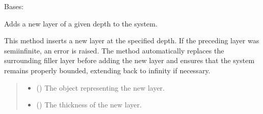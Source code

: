 \documentclass[letterpaper,10pt,english]{sphinxmanual}
\begin{document}

\begin{fulllineitems}
\label{\detokenize{generated/photon_canon.optics:photon_canon.optics.System}}
\pysigstartsignatures
\pysiglinewithargsret
{}
{\sphinxparamcomma {}\sphinxparamcomma {}\sphinxparamcomma {}\sphinxparamcomma {}\sphinxparamcomma {}}
{}
\pysigstopsignatures
\sphinxAtStartPar
Bases: 

\begin{fulllineitems}
\label{\detokenize{generated/photon_canon.optics:photon_canon.optics.System.add}}
\pysigstartsignatures
\pysiglinewithargsret
{}
{\sphinxparamcomma {}}
{}
\pysigstopsignatures
\sphinxAtStartPar
Adds a new layer of a given depth to the system.

\sphinxAtStartPar
This method inserts a new  layer at the specified depth. If the preceding layer was
semi\sphinxhyphen{}infinite, an error is raised. The method automatically replaces the surrounding filler layer
before adding the new layer and ensures that the system remains properly bounded, extending back
to infinity if necessary.
\begin{quote}\begin{description}
\begin{itemize}
\item {} 
\sphinxAtStartPar
{} ({\hyperref[\detokenize{generated/photon_canon.optics:photon_canon.optics.Medium}]{}}) \textendash{} The  object representing the new layer.

\item {} 
\sphinxAtStartPar
{} () \textendash{} The thickness of the new layer.


\end{itemize}
\end{description}
\end{quote}
\end{fulllineitems}
\end{fulllineitems}
\end{document}
